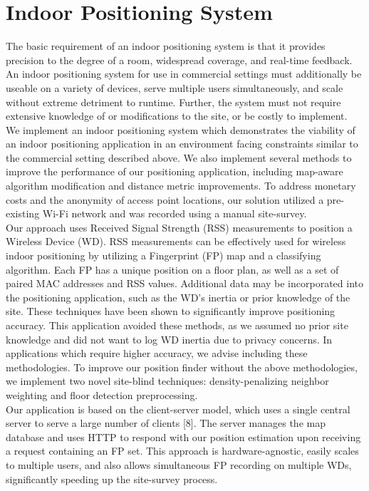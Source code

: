 \documentclass[conference]{IEEEtran}
\begin{document}
\section{Indoor Positioning System}
The basic requirement of an indoor positioning system is that it provides precision to the degree of a room, widespread coverage, and real-time feedback. An indoor positioning system for use in commercial settings must additionally be useable on a variety of devices, serve multiple users simultaneously, and scale without extreme detriment to runtime. Further, the system must not require extensive knowledge of or modifications to the site, or be costly to implement.\\
\indent We implement an indoor positioning system which demonstrates the viability of an indoor positioning application in an environment facing constraints similar to the commercial setting described above. We also implement several methods to improve the performance of our positioning application, including map-aware algorithm modification and distance metric improvements. To address monetary costs and the anonymity of access point locations, our solution utilized a pre-existing Wi-Fi network and was recorded using a manual site-survey.\\
\indent Our approach uses Received Signal Strength (RSS) measurements to position a Wireless Device (WD). RSS measurements can be effectively used for wireless indoor positioning by utilizing a Fingerprint (FP) map and a classifying algorithm. Each FP has a unique position on a floor plan, as well as a set of paired MAC addresses and RSS values.
Additional data may be incorporated into the positioning application, such as the WD's inertia or prior knowledge of the site. These techniques have been shown to significantly improve positioning accuracy. This application avoided these methods, as we assumed no prior site knowledge and did not want to log WD inertia due to privacy concerns. In applications which require higher accuracy, we advise including these methodologies. To improve our position finder without the above methodologies, we implement two novel site-blind techniques: density-penalizing neighbor weighting and floor detection preprocessing.\\
\indent Our application is based on the client-server model, which uses a single central server to serve a large number of clients [8]. The server manages the map database and uses HTTP to respond with our position estimation upon receiving a request containing an FP set. This approach is hardware-agnostic, easily scales to multiple users, and also allows simultaneous FP recording on multiple WDs, significantly speeding up the site-survey process.\\ 
\end{document}
